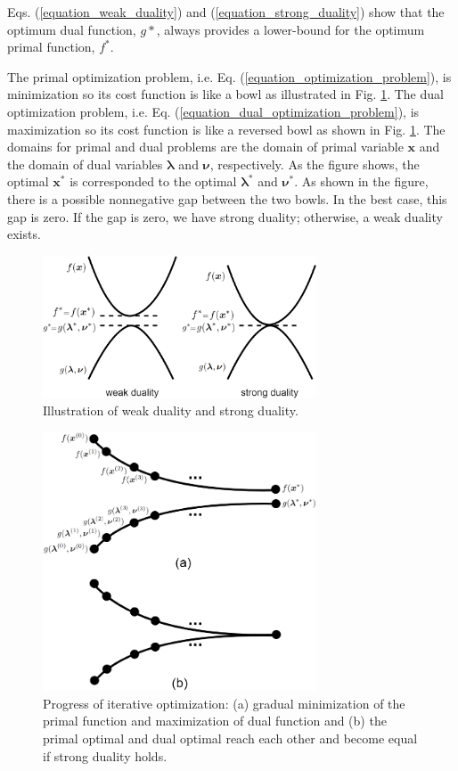 \documentclass[lang=cn,10pt]{gorgeousnbook}
\numberwithin{equation}{section}%
\numberwithin{figure}{section}%
\begin{document}
\begin{corollary}\label{corollary_dual_optimal_lower_bound_primal_optimal}
Eqs. (\ref{equation_weak_duality}) and (\ref{equation_strong_duality}) show that the optimum dual function, $g*$, always provides a lower-bound for the optimum primal function, $f^*$. 
\end{corollary}

The primal optimization problem, i.e. Eq. (\ref{equation_optimization_problem}), is minimization so its cost function is like a bowl as illustrated in Fig. \ref{figure_primal_dual_problems}. 
The dual optimization problem, i.e. Eq. (\ref{equation_dual_optimization_problem}), is maximization so its cost function is like a reversed bowl as shown in Fig. \ref{figure_primal_dual_problems}.
The domains for primal and dual problems are the domain of primal variable $\boldsymbol{x}$ and the domain of dual variables $\boldsymbol{\lambda}$ and $\boldsymbol{\nu}$, respectively. As the figure shows, the optimal $\boldsymbol{x}^*$ is corresponded to the optimal $\boldsymbol{\lambda}^*$ and $\boldsymbol{\nu}^*$. 
As shown in the figure, there is a possible nonnegative gap between the two bowls. In the best case, this gap is zero. If the gap is zero, we have strong duality; otherwise, a weak duality exists.

\begin{figure}[!t]
\centering
\includegraphics[width=3.2in]{./images/primal_dual_problems}
\caption{Illustration of weak duality and strong duality.}
\label{figure_primal_dual_problems}
\end{figure}

\begin{figure}[!t]
\centering
\includegraphics[width=3.2in]{./images/iterative_primal_dual}
\caption{Progress of iterative optimization: (a) gradual minimization of the primal function and maximization of dual function and (b) the primal optimal and dual optimal reach each other and become equal if strong duality holds.}
\label{figure_iterative_primal_dual}
\end{figure}
\end{document}
